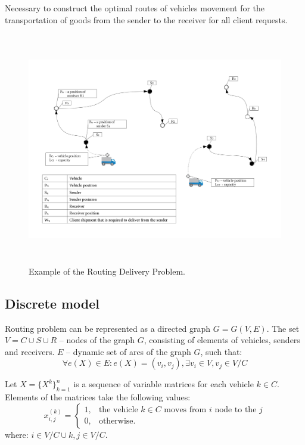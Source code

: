 \documentclass[]{TAACpaper}
\begin{document}
Necessary to construct the optimal routes of vehicles movement for the transportation of goods from the sender to the receiver for all client requests.

\begin{figure}[h]
	\hfil\includegraphics[height=4.0in]{images/scheme}\hfil
	\caption
	{
		Example of the Routing Delivery Problem.
	}
	\label{aba:fig1}
\end{figure}

\subsection{Discrete model}
Routing problem can be represented as a directed graph $G=G(V,E)$. The set $V=C\cup{S}\cup{R}$ -- nodes of the graph $G$, consisting of elements of vehicles, senders and receivers. $E$ -- dynamic set of arcs of the graph $G$, such that:
\begin{equation}
\forall e(X) \in E: e(X) = (v_i,v_j), \exists v_i \in V, v_j \in V/C
\end{equation}

Let $X = \{X^k\}^n_{k=1}$ is a sequence of variable matrices for each vehicle $k \in C$. Elements of the matrices take the following values:
\begin{equation}
  x^{(k)}_{i,j} = 
    \begin{cases}
	  1,&\text{the vehicle $k \in C$ moves from $i$ node to the $j$}\\
	  0,&\text{otherwise.}
    \end{cases}
\end{equation}
where: $i\in{V/C \cup {k}}, j \in V/C$.
\end{document}
